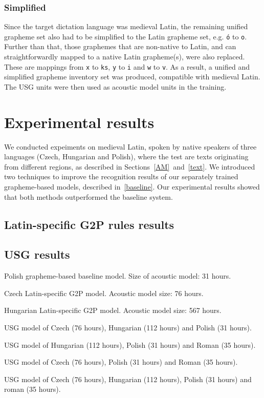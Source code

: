 \documentclass[runningheads,a4paper]{llncs}
\begin{document}
\subsubsection{Simplified}\label{simplified}
Since the target dictation language was medieval Latin, the remaining unified grapheme set also had to be simplified to the Latin grapheme set, e.g. \texttt{\'{o}} to \texttt{o}.
Further than that, those graphemes that are non-native to Latin, and can straightforwardly mapped to a native Latin grapheme(s), were also replaced.
These are mappings from \texttt{x} to \texttt{ks}, \texttt{y} to \texttt{i} and \texttt{w} to \texttt{v}.
As a result, a unified and simplified grapheme inventory set was produced, compatible with medieval Latin.
The USG units were then used as acoustic model units in the training.
\section{Experimental results}\label{results}
We conducted expeiments on medieval Latin, spoken by native speakers of three languages (Czech, Hungarian and Polish), where the test are texts originating from different regions, as described in Sections~\ref{AM}~and~\ref{text}.
We introduced two techniques to improve the recognition results of our separately trained grapheme-based models, described in~\ref{baseline}.
Our experimental results showed that both methods outperformed the baseline system.
\subsection{Latin-specific G2P rules results}
\subsection{USG results}
\begin{table}
\parbox{.45\linewidth}{
\centering
\caption{Polish grapheme-based baseline model. Size of acoustic model: 31 hours.}

}
\hfill
\parbox{.45\linewidth}{
\centering
\caption{Czech Latin-specific G2P model. Acoustic model size: 76 hours.}

}
\hfill
\parbox{.45\linewidth}{
\centering
\caption{Hungarian Latin-specific G2P model. Acoustic model size: 567 hours.}

}
\hfill
\parbox{.45\linewidth}{
\centering
\caption{USG model of Czech (76 hours), Hungarian (112 hours) and Polish (31 hours).}

}
\hfill
\parbox{.45\linewidth}{
\centering
\caption{USG model of Hungarian (112 hours), Polish (31 hours) and Roman (35 hours).}

}
\hfill
\parbox{.45\linewidth}{
\centering
\caption{USG model of Czech (76 hours), Polish (31 hours) and Roman (35 hours).}

}
\hfill
\parbox{.45\linewidth}{
\centering
\caption{USG model of Czech (76 hours), Hungarian (112 hours), Polish (31 hours) and roman (35 hours).}

}
\end{table}
\end{document}
